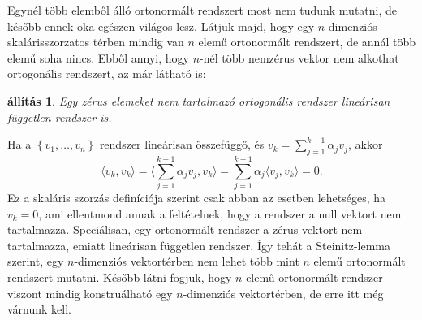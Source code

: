 \documentclass[a4paper, showtrims]{memoir}
\makeatletter
\renewenvironment{proof}[1][\proofname]
    {\par\pushQED{\qed}%
    \normalfont \topsep6\p@\@plus6\p@\relax
    \trivlist
    \item[\hskip\labelsep
        \itshape
    #1\@addpunct{:}]\ignorespaces}
    {\popQED\endtrivlist\@endpefalse}
\theoremstyle{plain}
\newtheorem{proposition}{állítás}[chapter]
\theoremstyle{remark}
\theoremstyle{definition}
\newcommand{\ip}[2]{\langle#1,#2\rangle}
\makeatother
\begin{document}
Egynél több elemből álló ortonormált rendszert most nem tudunk mutatni,
de később ennek oka egészen világos lesz.
Látjuk majd, hogy egy $n$-dimenziós skalárisszorzatos térben mindig van $n$ elemű ortonormált rendszert, de annál több elemű soha nincs.
Ebből annyi, hogy $n$-nél több nemzérus vektor nem alkothat ortogonális rendszert, az már látható is:
\begin{proposition}
	Egy zérus elemeket nem tartalmazó ortogonális rendszer lineárisan független rendszer is.
\end{proposition}
\begin{proof}
	Ha a $\left\{ v_1,\ldots,v_n \right\}$ rendszer lineárisan összefüggő,
	és $v_k=\sum_{j=1}^{k-1}\alpha_jv_j$,
	akkor
	\[
		\ip{v_k}{v_k}
		=
		\ip{\sum_{j=1}^{k-1}\alpha_jv_j}{v_k}
		=
		\sum_{j=1}^{k-1}\alpha_j\ip{v_j}{v_k}
		=0.
	\]
	Ez a skaláris szorzás definíciója szerint csak abban az esetben lehetséges,
	ha $v_k=0$, ami ellentmond annak a feltételnek, hogy a rendszer a null vektort nem tartalmazza.
\end{proof}
Speciálisan, egy ortonormált rendszer a zérus vektort nem tartalmazza,
emiatt lineárisan független rendszer.
Így tehát a Steinitz-lemma szerint,
egy $n$-dimenziós vektortérben nem lehet több mint $n$ elemű ortonormált rendszert mutatni.
Később látni fogjuk,
hogy $n$ elemű ortonormált rendszer viszont mindig konstruálható egy $n$-dimenziós vektortérben,
de erre itt még várnunk kell.
\end{document}

